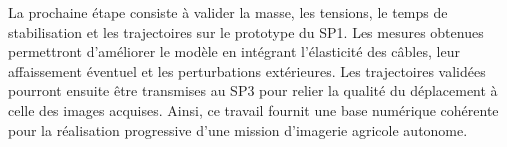 La prochaine étape consiste à valider la masse, les tensions, le temps de stabilisation et les trajectoires sur le prototype du SP1. Les mesures obtenues permettront d'améliorer le modèle en intégrant l'élasticité des câbles, leur affaissement éventuel et les perturbations extérieures. Les trajectoires validées pourront ensuite être transmises au SP3 pour relier la qualité du déplacement à celle des images acquises. Ainsi, ce travail fournit une base numérique cohérente pour la réalisation progressive d'une mission d'imagerie agricole autonome.

